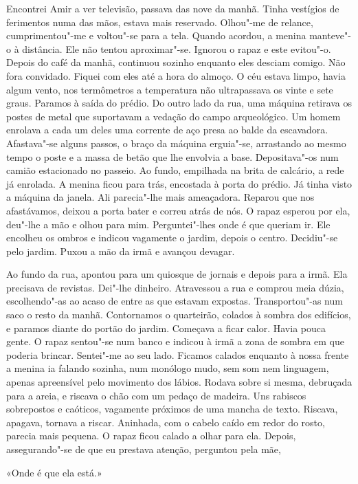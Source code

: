 Encontrei Amir a ver televisão, passava das nove da manhã. Tinha
vestígios de ferimentos numa das mãos, estava mais reservado. Olhou"-me
de relance, cumprimentou"-me e voltou"-se para a tela. Quando acordou, a
menina manteve"-o à distância. Ele não tentou aproximar"-se. Ignorou o
rapaz e este evitou"-o. Depois do café da manhã, continuou sozinho
enquanto eles desciam comigo. Não fora convidado. Fiquei com eles até a
hora do almoço. O céu estava limpo, havia algum vento, nos termômetros a
temperatura não ultrapassava os vinte e sete graus. Paramos à saída do
prédio. Do outro lado da rua, uma máquina retirava os postes de metal
que suportavam a vedação do campo arqueológico. Um homem enrolava a cada
um deles uma corrente de aço presa ao balde da escavadora. Afastava"-se
alguns passos, o braço da máquina erguia"-se, arrastando ao mesmo tempo
o poste e a massa de betão que lhe envolvia a base. Depositava"-os num
camião estacionado no passeio. Ao fundo, empilhada na brita de calcário,
a rede já enrolada. A menina ficou para trás, encostada à porta do
prédio. Já tinha visto a máquina da janela. Ali parecia"-lhe mais
ameaçadora. Reparou que nos afastávamos, deixou a porta bater e correu
atrás de nós. O rapaz esperou por ela, deu"-lhe a mão e olhou para mim.
Perguntei"-lhes onde é que queriam ir. Ele encolheu os ombros e indicou
vagamente o jardim, depois o centro. Decidiu"-se pelo jardim. Puxou a
mão da irmã e avançou devagar.

Ao fundo da rua, apontou para um quiosque de jornais e depois para a
irmã. Ela precisava de revistas. Dei"-lhe dinheiro. Atravessou a rua e
comprou meia dúzia, escolhendo"-as ao acaso de entre as que estavam
expostas. Transportou"-as num saco o resto da manhã. Contornamos o
quarteirão, colados à sombra dos edifícios, e paramos diante do portão
do jardim. Começava a ficar calor. Havia pouca gente. O rapaz sentou"-se
num banco e indicou à irmã a zona de sombra em que poderia brincar.
Sentei"-me ao seu lado. Ficamos calados enquanto à nossa frente a menina
ia falando sozinha, num monólogo mudo, sem som nem linguagem, apenas
apreensível pelo movimento dos lábios. Rodava sobre si mesma, debruçada
para a areia, e riscava o chão com um pedaço de madeira. Uns rabiscos
sobrepostos e caóticos, vagamente próximos de uma mancha de texto.
Riscava, apagava, tornava a riscar. Aninhada, com o cabelo caído em
redor do rosto, parecia mais pequena. O rapaz ficou calado a olhar para
ela. Depois, assegurando"-se de que eu prestava atenção, perguntou pela
mãe,

«Onde é que ela está.»

